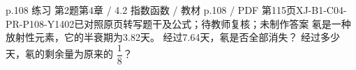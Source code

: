 \par\noindent\begin{minipage}{\linewidth}
\begin{bankitem}{p.108 练习 第2题}{第4章 / 4.2 指数函数 / 教材 p.108 / PDF 第115页}{XJ-B1-C04-PR-P108-Y1402}{已对照原页转写题干及公式；待教师复核；未制作答案}
氡是一种放射性元素，它的半衰期为3.82天。
经过7.64天，氡是否全部消失？
经过多少天，氡的剩余量为原来的 $\dfrac18$？
\end{bankitem}
\end{minipage}\par\medskip
